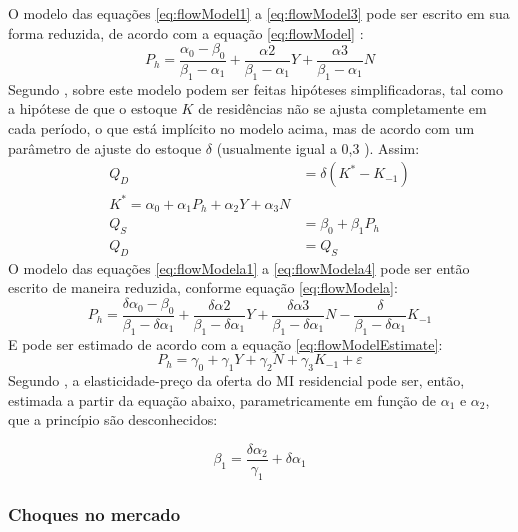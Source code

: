 \documentclass[
	12pt,				%
	oneside,			%
	a4paper,			%
	chapter=TITLE,		%
	section=TITLE,		%
	english,			%
	brazil				%
	]{abntex2}
\begin{document}
O modelo das equações \eqref{eq:flowModel1} a \eqref{eq:flowModel3} pode ser
escrito em sua forma reduzida, de acordo com a equação \eqref{eq:flowModel}
\autocite[ p.~283]{longrunsupplyelasticity}:
\begin{equation}
P_h = \frac{\alpha_0 - \beta_0}{\beta_1 - \alpha_1} + \frac{\alpha2}{\beta_1 - \alpha_1}Y + \frac{\alpha3}{\beta_1 - \alpha_1} N
\label{eq:flowModel}
\end{equation}
Segundo \textcite[p.~285]{longrunsupplyelasticity}, sobre este modelo podem ser feitas
hipóteses simplificadoras, tal como a hipótese de que o estoque \(K\) de
residências não se ajusta completamente em cada período, o que está implícito
no modelo acima, mas de acordo com um parâmetro de ajuste do estoque \(\delta\)
(usualmente igual a 0,3 \autocite[p.~285]{longrunsupplyelasticity}). Assim:
\begin{align} 
Q_D &= \delta (K^* - K_{-1}) \label{eq:flowModela1}\\ 
K^* = \alpha_0 + \alpha_1 P_h + \alpha_2 Y + \alpha_3 N \label{eq:flowModela2}\\ 
Q_S &= \beta_0 + \beta_1 P_h \label{eq:flowModela3}\\
Q_D &= Q_S \label{eq:flowModela4}
\end{align}
O modelo das equações \eqref{eq:flowModela1} a \eqref{eq:flowModela4} pode ser
então escrito de maneira reduzida, conforme equação \eqref{eq:flowModela}:
\begin{equation}
P_h = \frac{\delta \alpha_0 - \beta_0}{\beta_1 - \delta \alpha_1} + \frac{\delta \alpha2}{\beta_1 - \delta \alpha_1}Y + \frac{\delta \alpha3}{\beta_1 - \delta \alpha_1} N - \frac{\delta}{\beta_1 - \delta \alpha_1}K_{-1}
\label{eq:flowModela}
\end{equation}
E pode ser estimado de acordo com a equação \eqref{eq:flowModelEstimate}:
\begin{equation}
P_h = \gamma_0 + \gamma_1 Y + \gamma_2 N + \gamma_3 K_{-1} + \varepsilon
\label{eq:flowModelEstimate}
\end{equation}
Segundo \textcite[p.~285]{longrunsupplyelasticity}, a elasticidade-preço da oferta do
\gls{MI} residencial pode ser, então, estimada a partir da equação abaixo,
parametricamente em função de \(\alpha_1\) e \(\alpha_2\), que a princípio são
desconhecidos:

\[\beta_1 = \frac{\delta \alpha_2}{\gamma_1} + \delta \alpha_1\]

\hypertarget{choques-no-mercado}{%
\subsubsection{Choques no mercado}\label{choques-no-mercado}}
\end{document}
